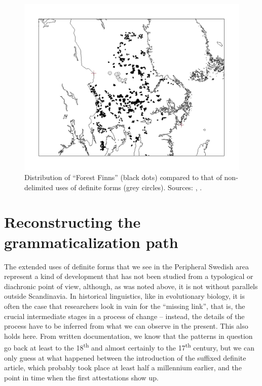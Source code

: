 \begin{figure}[h]

\includegraphics[height=.5\textheight]{figures/20_ForestFinns}
\caption{Distribution of “Forest Finns” (black dots) compared to that of non-delimited uses of definite forms (grey circles). Sources: \citet{Tarkiainen1990}, \citet{Broberg1980}.}
\label{map:16}

\end{figure}

\section{ Reconstructing the grammaticalization path}
\label{sec:3.4}

The extended uses of definite forms that we see in the Peripheral Swedish area represent a kind of development that has not been studied from a typological or diachronic point of view, although, as was noted above, it is not without parallels outside Scandinavia. In historical linguistics, like in evolutionary biology, it is often the case that researchers look in vain for the “missing link”, that is, the crucial intermediate stages in a process of change – instead, the details of the process have to be inferred from what we can observe in the present. This also holds here. From written documentation, we know that the patterns in question go back at least to the 18\textsuperscript{th} and almost certainly to the 17\textsuperscript{th} century, but we can only guess at what happened between the introduction of the suffixed definite article, which probably took place at least half a millennium earlier, and the point in time when the first attestations show up. 

